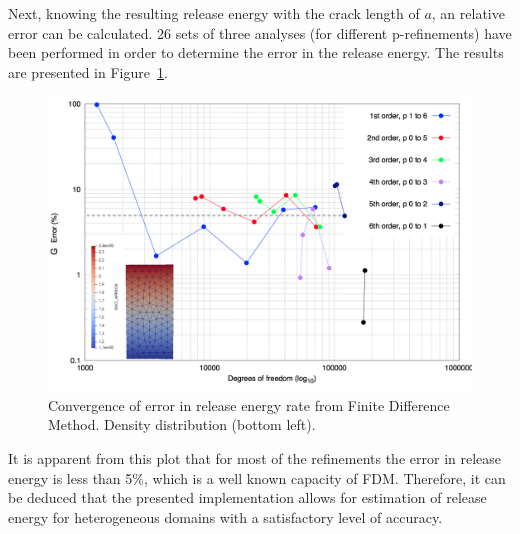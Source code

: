 \documentclass[11pt]{acmeArticle}
\numberwithin{equation}{section}
\begin{document}
Next, knowing the resulting release energy with the crack length of $a$, an relative error can be calculated. 26 sets of three analyses (for different p-refinements) have been performed in order to determine the error in the release energy. 
The results are presented in Figure~\ref{fig:covergencefdm}.
\begin{figure}
	\centering
	\includegraphics[width=0.7\linewidth]{Figures/graphs/covergence_FDM.png}
	\caption{Convergence of error in release energy rate from Finite Difference Method. Density distribution (bottom left).}
	\label{fig:covergencefdm}
\end{figure}
It is apparent from this plot that for most of the refinements the error in release energy is less than 5\%, which is a well known capacity of FDM.  %
Therefore, it can be deduced that the presented implementation allows for estimation of release energy for heterogeneous domains with a satisfactory level of accuracy.
\end{document}
